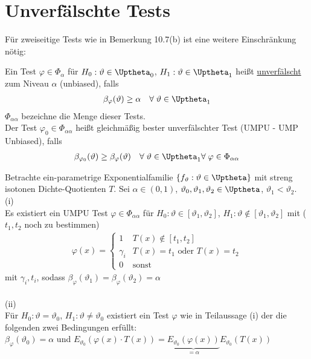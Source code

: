 \documentclass[a4paper,openany]{book}
\theoremstyle{mytheoremstyle}
\theoremstyle{mytheoremstyle2}
\begin{document}
\chapter{Unverfälschte Tests}
Für zweiseitige Tests wie in Bemerkung 10.7(b) ist eine weitere Einschränkung nötig:
\begin{defi}{11.1}{}
  Ein Test $\varphi \in \Phi _{\alpha }$ für $H_0:\vartheta \in \Uptheta_0$, $H_1:\vartheta \in \Uptheta_1$ heißt \underline{unverfälscht} zum Niveau $\alpha $ (unbiased), falls
  \begin{align*}
    \beta _{\varphi }(\vartheta )\geq \alpha \quad \forall\;\vartheta \in \Uptheta_1
  \end{align*}
  $\Phi _{\alpha \alpha }$ bezeichne die Menge dieser Tests. \\
  Der Test $\varphi _0 \in \Phi _{\alpha \alpha }$ heißt gleichmäßig bester unverfälschter Test (UMPU - UMP Unbiased), falls
  \begin{align*}
    \beta _{\varphi _0}(\vartheta )\geq \beta _{\varphi }(\vartheta)\quad \forall\;\vartheta \in \Uptheta_1 \forall\;\varphi \in \Phi _{\alpha \alpha }
  \end{align*}
\end{defi}
\begin{theo}{11.2}{}
  Betrachte ein-parametrige Exponentialfamilie $\{f _{\vartheta }:\vartheta \in \Uptheta\} $ mit streng isotonen Dichte-Quotienten $T$. Sei $\alpha \in (0,1)$, $\vartheta _0,\vartheta_1 ,\vartheta _2 \in \Uptheta$, $\vartheta _1<\vartheta _2$. \\
  (i)\\
  Es existiert ein UMPU Test $\varphi \in \Phi _{\alpha \alpha }$ für $H_0:\vartheta \in [\vartheta _1,\vartheta _2]$, $H_1:\vartheta \notin [\vartheta _1,\vartheta _2]$ mit ($t_1,t_2$ noch zu bestimmen)
  \begin{align*}
    \varphi (x)=\begin{cases}
      1 &T(x)\notin  [t_1,t_2]\\
      \gamma _i&T(x)=t_1 \text{ oder }T(x)=t_2 \\
      0&\text{sonst}
    \end{cases}
  \end{align*}
  mit $\gamma _i,t_i$, sodass $\beta _{\varphi }(\vartheta _1)=\beta _{\varphi }(\vartheta _2)=\alpha $   \\\\
  (ii)\\ 
  Für $H_0:\vartheta =\vartheta _0$, $H_1:\vartheta \neq \vartheta _0$ existiert ein Test $\varphi $ wie in Teilaussage (i) der die folgenden zwei Bedingungen erfüllt: \\
  $\beta _{\varphi }(\vartheta _0)=\alpha $ und $E _{\vartheta _0}(\varphi (x)\cdot T(x))=\underbrace{E _{\vartheta _0}(\varphi(x) )}_{=\alpha }E _{\vartheta _0}(T(x))$  
\end{theo}
\end{document}
